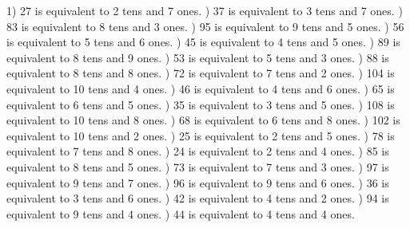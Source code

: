 \documentclass{article}%
\begin{document}
1) 27 is equivalent to  2 tens and 7 ones.%
) 37 is equivalent to  3 tens and 7 ones.%
) 83 is equivalent to  8 tens and 3 ones.%
) 95 is equivalent to  9 tens and 5 ones.%
) 56 is equivalent to  5 tens and 6 ones.%
) 45 is equivalent to  4 tens and 5 ones.%
) 89 is equivalent to  8 tens and 9 ones.%
) 53 is equivalent to  5 tens and 3 ones.%
) 88 is equivalent to  8 tens and 8 ones.%
) 72 is equivalent to  7 tens and 2 ones.%
) 104 is equivalent to  10 tens and 4 ones.%
) 46 is equivalent to  4 tens and 6 ones.%
) 65 is equivalent to  6 tens and 5 ones.%
) 35 is equivalent to  3 tens and 5 ones.%
) 108 is equivalent to  10 tens and 8 ones.%
) 68 is equivalent to  6 tens and 8 ones.%
) 102 is equivalent to  10 tens and 2 ones.%
) 25 is equivalent to  2 tens and 5 ones.%
) 78 is equivalent to  7 tens and 8 ones.%
) 24 is equivalent to  2 tens and 4 ones.%
) 85 is equivalent to  8 tens and 5 ones.%
) 73 is equivalent to  7 tens and 3 ones.%
) 97 is equivalent to  9 tens and 7 ones.%
) 96 is equivalent to  9 tens and 6 ones.%
) 36 is equivalent to  3 tens and 6 ones.%
) 42 is equivalent to  4 tens and 2 ones.%
) 94 is equivalent to  9 tens and 4 ones.%
) 44 is equivalent to  4 tens and 4 ones.%
\end{document}
